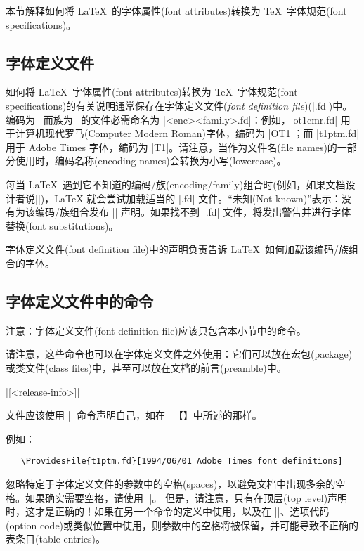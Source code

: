 \documentclass{ltxguide}[1995/11/28]
\newcommand{\heiti}{\CJKfamily{heiti}} %
\newcommand{\kaiti}{\CJKfamily{kaiti}} %
\begin{document}
本节解释如何将 \LaTeX\ 的字体属性(font attributes)转换为 \TeX{}\ 字体规范(font specifications)。


\subsection[字体定义文件]{\heiti 字体定义文件}

如何将 \LaTeX{}\ 字体属性(font attributes)转换为 \TeX{}\ 字体规范(font specifications)的有关说明通常保存在{\kaiti 字体定义文件}(\emph{font definition file})(|.fd|)中。编码为 \ 而族为 \ 的文件必需命名为 |<enc><family>.fd|：例如，|ot1cmr.fd| 用于计算机现代罗马(Computer Modern Roman)字体，编码为 |OT1|；而 |t1ptm.fd| 用于 Adobe Times 字体，编码为 |T1|。请注意，当作为文件名(file names)的一部分使用时，编码名称(encoding names)会转换为小写(lowercase)。

每当 \LaTeX{}\ 遇到它不知道的编码/族(encoding/family)组合时(例如，如果文档设计者说|\selectfont|)，\LaTeX{} 就会尝试加载适当的 |.fd| 文件。“未知(Not known)”表示：没有为该编码/族组合发布 |\DeclareFontFamily| 声明。如果找不到 |.fd| 文件，将发出警告并进行字体替换(font substitutions)。

字体定义文件(font definition file)中的声明负责告诉 \LaTeX{}\ 如何加载该编码/族组合的字体。



\subsection[字体定义文件中的命令]{\heiti 字体定义文件中的命令}

{\kaiti 注意}：字体定义文件(font definition file)应该只包含本小节中的命令。

请注意，这些命令也可以在字体定义文件之外使用：它们可以放在宏包(package)或类文件(class files)中，甚至可以放在文档的前言(preamble)中。

\begin{decl}
  |[<release-info>]|
\end{decl}
文件应该使用 |\ProvidesFile| 命令声明自己，如在 {\color{blue}{\emph{\clsguide}}}\ 【{\color{blue}{《文档类和宏包作者的 \LaTeXe》}}】中所述的那样。

例如：
\begin{verbatim}
   \ProvidesFile{t1ptm.fd}[1994/06/01 Adobe Times font definitions]
\end{verbatim}

忽略特定于字体定义文件的参数中的空格(spaces)，以避免文档中出现多余的空格。如果确实需要空格，请使用 |\space|。
但是，请注意，只有在顶层(top level)声明时，这才是正确的！如果在另一个命令的定义中使用，以及在 |\AtBeginDocument|、选项代码(option code)或类似位置中使用，则参数中的空格将被保留，并可能导致不正确的表条目(table entries)。
\end{document}
